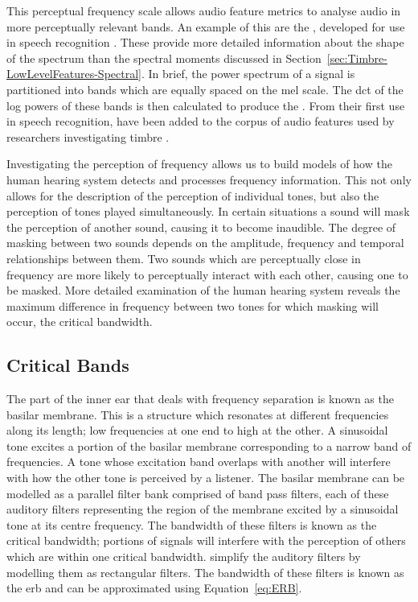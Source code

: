 		This perceptual frequency scale allows audio feature metrics to analyse audio in more perceptually relevant
		bands. An example of this are the , developed for use in speech recognition
		\citep{davis1980comparison}. These provide more detailed information about the shape of the spectrum than
		the spectral moments discussed in Section~\ref{sec:Timbre-LowLevelFeatures-Spectral}. In brief, the power
		spectrum of a signal is partitioned into bands which are equally spaced on the mel scale.  The
		\acrfull{dct} of the log powers of these bands is then calculated to produce the . From
		their first use in speech recognition,  have been added to the corpus of audio features
		used by researchers investigating timbre \citep{depoli1997sonological}. 

		Investigating the perception of frequency allows us to build models of how the human hearing system detects
		and processes frequency information. This not only allows for the description of the perception of
		individual tones, but also the perception of tones played simultaneously. In certain situations a sound
		will mask the perception of another sound, causing it to become inaudible. The degree of masking between
		two sounds depends on the amplitude, frequency and temporal relationships between them. Two sounds which
		are perceptually close in frequency are more likely to perceptually interact with each other, causing one
		to be masked. More detailed examination of the human hearing system reveals the maximum difference in
		frequency between two tones for which masking will occur, the critical bandwidth.

	\subsection{Critical Bands}
	\label{sec:Timbre-PsychoacousticPrinciples-CriticalBands}
		The part of the inner ear that deals with frequency separation is known as the basilar membrane. This is a
		structure which resonates at different frequencies along its length; low frequencies at one end to high at
		the other. A sinusoidal tone excites a portion of the basilar membrane corresponding to a narrow band of
		frequencies. A tone whose excitation band overlaps with another will interfere with how the other tone is
		perceived by a listener. The basilar membrane can be modelled as a parallel filter bank comprised of band
		pass filters, each of these auditory filters representing the region of the membrane excited by a
		sinusoidal tone at its centre frequency. The bandwidth of these filters is known as the critical bandwidth;
		portions of signals will interfere with the perception of others which are within one critical bandwidth.
		\citet{glasberg1990derivation} simplify the auditory filters by modelling them as rectangular filters. The
		bandwidth of these filters is known as the \acrfull{erb} and can be approximated using
		Equation~\ref{eq:ERB}.

